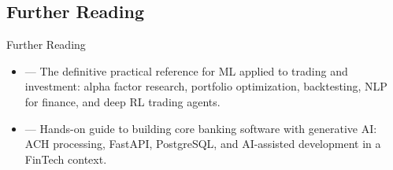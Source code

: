 \subsection*{Further Reading}


\begin{v3topic}{Further Reading}
    \begin{itemize}
        \item {} --- The definitive practical reference for ML applied to trading and investment: alpha factor research, portfolio optimization, backtesting, NLP for finance, and deep RL trading agents.
        \item {} --- Hands-on guide to building core banking software with generative AI: ACH processing, FastAPI, PostgreSQL, and AI-assisted development in a FinTech context.
    \end{itemize}

\end{v3topic}
